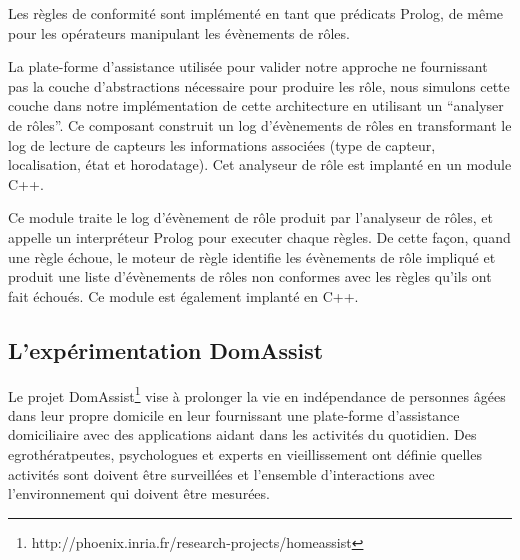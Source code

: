 
Les règles de conformité sont implémenté en tant que prédicats Prolog, de même pour les opérateurs manipulant les évènements de rôles. 

La plate-forme d'assistance utilisée pour valider notre approche ne fournissant pas la couche d'abstractions nécessaire pour produire les rôle, nous simulons cette couche dans notre implémentation de cette architecture en utilisant un ``analyser de rôles''. Ce composant construit un log d'évènements de rôles en transformant le log de lecture de capteurs les informations associées (type de capteur, localisation, état et horodatage). Cet analyseur de rôle est implanté en un module C++.

Ce module traite le log d'évènement de rôle produit par l'analyseur de rôles, et appelle un interpréteur Prolog pour executer chaque règles. De cette façon, quand une règle échoue, le moteur de règle identifie les évènements de rôle impliqué et produit une liste d'évènements de rôles non conformes avec les règles qu'ils ont fait échoués. Ce module est également implanté en C++. 

\subsection{L'expérimentation DomAssist}\label{validation:domassist}
Le projet DomAssist\footnote{ \tiny http://phoenix.inria.fr/research-projects/homeassist} vise à prolonger la vie en indépendance de personnes âgées dans leur propre domicile en leur fournissant une plate-forme d'assistance domiciliaire avec des applications aidant dans les activités du quotidien. Des egrothératpeutes, psychologues et experts en vieillissement ont définie quelles activités sont doivent être surveillées et l'ensemble d'interactions avec l'environnement qui doivent être mesurées.

